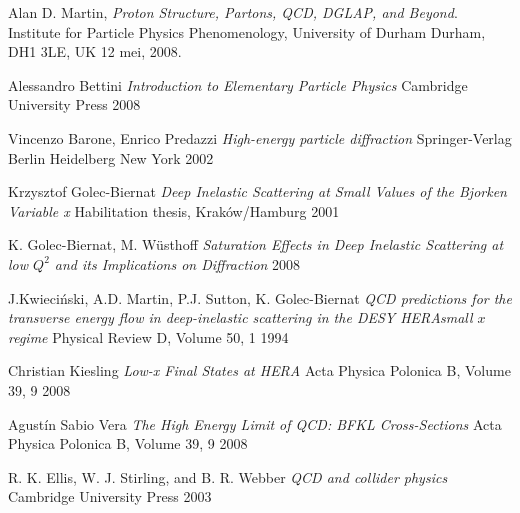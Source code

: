 \documentclass[a4paper,11pt]{article}
\numberwithin{equation}{section} %
\begin{document}
\newpage
\begin{thebibliography}{99}

  Alan D. Martin,
  \emph{Proton Structure, Partons, QCD, DGLAP, and Beyond}.
  Institute for Particle Physics Phenomenology,
  University of Durham
  Durham, DH1 3LE, UK
  12 mei, 2008.

  Alessandro Bettini
  \emph{Introduction to Elementary Particle Physics}
  Cambridge University Press
  2008

  Vincenzo Barone, Enrico Predazzi
  \emph{High-energy particle diffraction}
  Springer-Verlag Berlin Heidelberg New York
  2002

  Krzysztof Golec-Biernat
  \emph{Deep Inelastic Scattering at Small Values of the Bjorken Variable x}
  Habilitation thesis,
  Kraków/Hamburg
  2001

  K. Golec-Biernat, M. Wüsthoff
 \emph{ Saturation Effects in Deep Inelastic Scattering at low $Q^2$ and its Implications on Diffraction}
  2008
  
  J.Kwieciński, A.D. Martin, P.J. Sutton, K. Golec-Biernat
  \emph{QCD predictions for the transverse energy flow in deep-inelastic scattering in the DESY HERAsmall $x$ regime}
  Physical Review D, Volume 50, 1
  1994

  Christian Kiesling
  \emph{Low-x Final States at HERA}
  Acta Physica Polonica B, Volume 39, 9
  2008

  Agustín Sabio Vera
  \emph{The High Energy Limit of QCD: BFKL Cross-Sections}
  Acta Physica Polonica B, Volume 39, 9
  2008

  R. K. Ellis, W. J. Stirling, and B. R. Webber
  \emph{QCD and collider physics}
  Cambridge University Press
  2003
\end{thebibliography}
\end{document}
